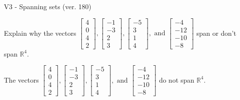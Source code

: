 \begin{exercise}
  \begin{exerciseTitle}V3 - Spanning sets (ver. 180)\end{exerciseTitle}
  \begin{exerciseStatement}
    Explain why the vectors \(\left[\begin{array}{r}
4 \\
0 \\
4 \\
2
\end{array}\right] , \left[\begin{array}{r}
-1 \\
-3 \\
2 \\
3
\end{array}\right] , \left[\begin{array}{r}
-5 \\
3 \\
1 \\
4
\end{array}\right] , \text{ and } \left[\begin{array}{r}
-4 \\
-12 \\
-10 \\
-8
\end{array}\right]\) span or don't span \(\mathbb{R}^4\). 
	


  \end{exerciseStatement}
  \begin{exerciseAnswer}
   The vectors \(\left[\begin{array}{r}
4 \\
0 \\
4 \\
2
\end{array}\right] , \left[\begin{array}{r}
-1 \\
-3 \\
2 \\
3
\end{array}\right] , \left[\begin{array}{r}
-5 \\
3 \\
1 \\
4
\end{array}\right] , \text{ and } \left[\begin{array}{r}
-4 \\
-12 \\
-10 \\
-8
\end{array}\right]\) 
  	 do not  
	span \(\mathbb{R}^4\).
  


  \end{exerciseAnswer}
\end{exercise}